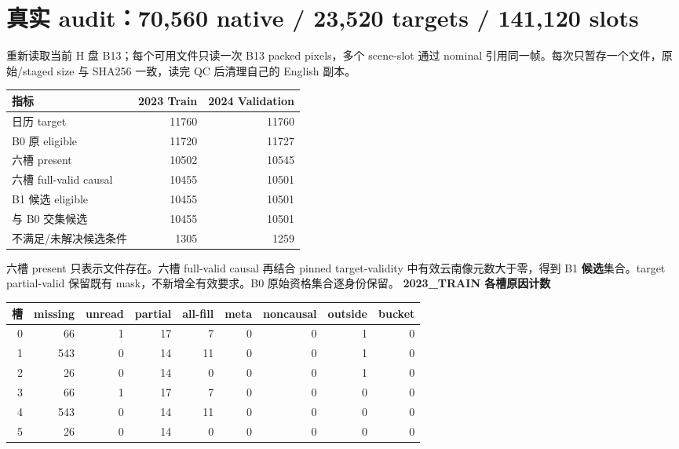 \documentclass[UTF8,11pt,a4paper,fontset=windows]{ctexart}
\begin{document}
\section*{真实 audit：70,560 native / 23,520 targets / 141,120 slots}
重新读取当前 H 盘 B13；每个可用文件只读一次 B13 packed pixels，多个 scene-slot 通过 nominal 引用同一帧。每次只暂存一个文件，原始/staged size 与 SHA256 一致，读完 QC 后清理自己的 English 副本。
\begin{center}\small\begin{tabular}{lrr}\toprule 指标 & 2023 Train & 2024 Validation\\\midrule
日历 target & 11760 & 11760\\
B0 原 eligible & 11720 & 11727\\
六槽 present & 10502 & 10545\\
六槽 full-valid causal & 10455 & 10501\\
B1 候选 eligible & 10455 & 10501\\
与 B0 交集候选 & 10455 & 10501\\
不满足/未解决候选条件 & 1305 & 1259\\
\bottomrule\end{tabular}\end{center}
六槽 present 只表示文件存在。六槽 full-valid causal 再结合 pinned target-validity 中有效云南像元数大于零，得到 B1 \textbf{候选}集合。target partial-valid 保留既有 mask，不新增全有效要求。B0 原始资格集合逐身份保留。
\textbf{2023\_TRAIN 各槽原因计数}\par\begin{center}\scriptsize\begin{tabular}{rrrrrrrrr}\toprule 槽 & missing & unread & partial & all-fill & meta & noncausal & outside & bucket\\\midrule
0 & 66 & 1 & 17 & 7 & 0 & 0 & 1 & 0\\
1 & 543 & 0 & 14 & 11 & 0 & 0 & 1 & 0\\
2 & 26 & 0 & 14 & 0 & 0 & 0 & 1 & 0\\
3 & 66 & 1 & 17 & 7 & 0 & 0 & 0 & 0\\
4 & 543 & 0 & 14 & 11 & 0 & 0 & 0 & 0\\
5 & 26 & 0 & 14 & 0 & 0 & 0 & 0 & 0\\
\bottomrule\end{tabular}\end{center}
\end{document}
